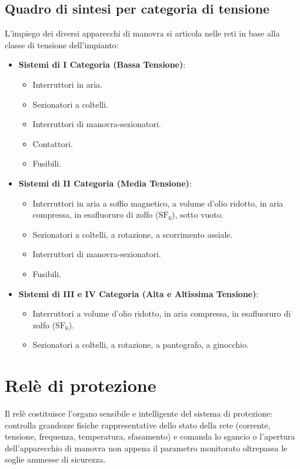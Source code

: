 \subsection{Quadro di sintesi per categoria di tensione}
L'impiego dei diversi apparecchi di manovra si articola nelle reti in base alla classe di tensione dell'impianto:
\begin{itemize}
    \item \textbf{Sistemi di I Categoria (Bassa Tensione)}:
    \begin{itemize}
        \item Interruttori in aria.
        \item Sezionatori a coltelli.
        \item Interruttori di manovra-sezionatori.
        \item Contattori.
        \item Fusibili.
    \end{itemize}
    \item \textbf{Sistemi di II Categoria (Media Tensione)}:
    \begin{itemize}
        \item Interruttori in aria a soffio magnetico, a volume d'olio ridotto, in aria compressa, in esafluoruro di zolfo ($\text{SF}_6$), sotto vuoto.
        \item Sezionatori a coltelli, a rotazione, a scorrimento assiale.
        \item Interruttori di manovra-sezionatori.
        \item Fusibili.
    \end{itemize}
    \item \textbf{Sistemi di III e IV Categoria (Alta e Altissima Tensione)}:
    \begin{itemize}
        \item Interruttori a volume d'olio ridotto, in aria compressa, in esafluoruro di zolfo ($\text{SF}_6$).
        \item Sezionatori a coltelli, a rotazione, a pantografo, a ginocchio.
    \end{itemize}
\end{itemize}

\section{Relè di protezione}
Il relè costituisce l'organo sensibile e intelligente del sistema di protezione: controlla grandezze fisiche rappresentative dello stato della rete (corrente, tensione, frequenza, temperatura, sfasamento) e comanda lo sgancio o l'apertura dell'apparecchio di manovra non appena il parametro monitorato oltrepassa le soglie ammesse di sicurezza.

